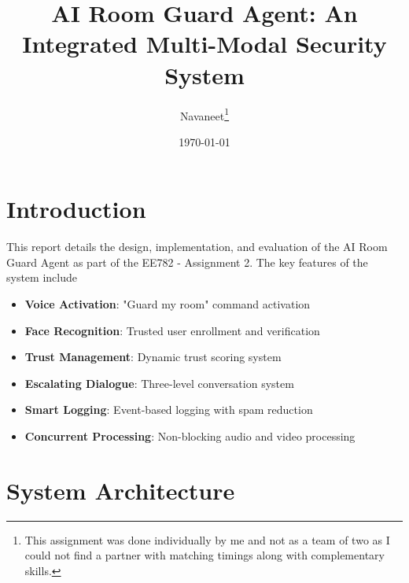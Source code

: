 \documentclass[11pt,a4paper]{article}
\title{\textbf{AI Room Guard Agent: An Integrated Multi-Modal Security System}}
\author{Navaneet\footnote{This assignment was done individually by me and not as a team of two as I could not find a partner with matching timings along with complementary skills.}}
\date{\today}
\begin{document}
\maketitle


\section{Introduction}
This report details the design, implementation, and evaluation of the AI Room Guard Agent as part of the EE782 - Assignment 2. The key features of the system include
\begin{itemize}
    \item \textbf{Voice Activation}: "Guard my room" command activation
    \item \textbf{Face Recognition}: Trusted user enrollment and verification
    \item \textbf{Trust Management}: Dynamic trust scoring system
    \item \textbf{Escalating Dialogue}: Three-level conversation system
    \item \textbf{Smart Logging}: Event-based logging with spam reduction
    \item \textbf{Concurrent Processing}: Non-blocking audio and video processing
\end{itemize}

\section{System Architecture}
\end{document}
